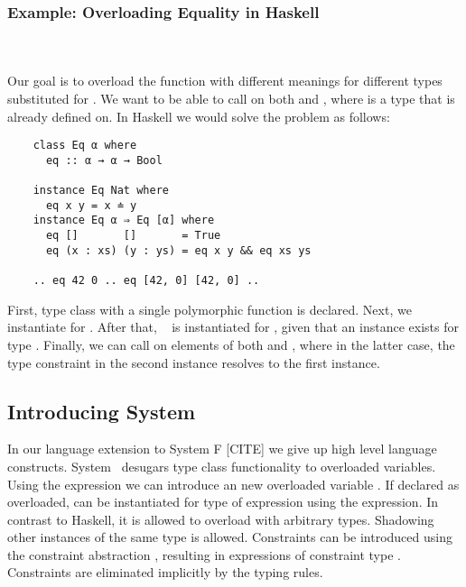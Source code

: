 \subsubsection{Example: Overloading Equality in Haskell}\hfill\\\\
Our goal is to overload the function  with different meanings for different types substituted for .
We want to be able to call  on both  and \inl{[α]}, where  is a type that  is already defined on. 
In Haskell we would solve the problem as follows:
\begin{verbatim}
    class Eq α where
      eq :: α → α → Bool 

    instance Eq Nat where
      eq x y = x ≐ y
    instance Eq α ⇒ Eq [α] where
      eq []       []       = True
      eq (x : xs) (y : ys) = eq x y && eq xs ys 

    .. eq 42 0 .. eq [42, 0] [42, 0] ..
\end{verbatim}
First, type class  with a single polymorphic function  is declared. Next, we instantiate  for . 
After that, \  is instantiated for \inl{[α]}, given that an instance  exists for type . 
Finally, we can call  on elements of both  and \inl{[Nat]}, where in the latter case, the type constraint  in the second instance resolves to the first instance.

\subsection{Introducing System \Fo}
In our language extension to System F [CITE] we give up high level language constructs. 
System \Fo\ desugars type class functionality to overloaded variables. 
Using the  expression we can introduce an new overloaded variable . 
If declared as overloaded,  can be instantiated for type  of expression  using the  expression.
In contrast to Haskell, it is allowed to overload  with arbitrary types. 
Shadowing other instances of the same type is allowed.
Constraints can be introduced using the constraint abstraction , resulting in expressions of constraint type . 
Constraints are eliminated implicitly by the typing rules.

